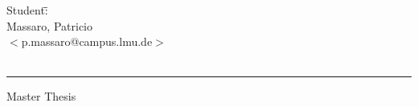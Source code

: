 \documentclass[11pt]{article}
\numberwithin{figure}{section}
\numberwithin{table}{section}
\begin{document}
\begin{titlepage}
\begin{tabbing}
	Student:\hspace{-1cm}\=\+\hspace{1cm}\=\hspace{6cm}\=\\
		Massaro, Patricio	\>\> \\
			\>\footnotesize{$<$p.massaro@campus.lmu.de$>$}\\
		\\
\end{tabbing}

\vfill

\hrule
\vspace{0.2cm}
\noindent\small{Master Thesis\hfill }
\end{titlepage}



\tableofcontents
\newpage

%
%
\setcounter{page}{1}











\newpage

\pagestyle{empty}


\end{document}
